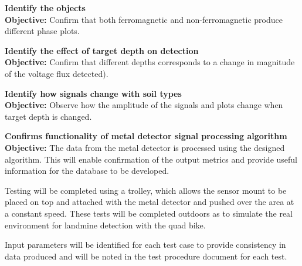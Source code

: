 \documentclass[main.tex]{subfiles}
\begin{document}
\begin{appendices}
\begin{mds}
\end{mds}

\begin{mds}
\textbf{Identify the objects}\\
\textbf{Objective:} Confirm that both ferromagnetic and non-ferromagnetic produce different phase plots.

\end{mds}

\begin{mds}
\textbf{Identify the effect of target depth on detection}\\
\textbf{Objective:} Confirm that different depths corresponds to a change in magnitude of the voltage flux detected). 

\end{mds}
\begin{mds}
\textbf{Identify how signals change with soil types}\\
\textbf{Objective:} Observe how the amplitude of the signals and plots change when target depth is changed. 

\end{mds}
\begin{mds}
\textbf{Confirms functionality of metal detector signal processing algorithm}\\
\textbf{Objective:} The data from the metal detector is processed using the designed algorithm. This will enable confirmation of the output metrics and provide useful information for the database to be developed. 

\end{mds}

\medskip\noindent
Testing will be completed using a trolley, which allows the sensor mount to be placed on top and attached with the metal detector and pushed over the area at a constant speed. These tests will be completed outdoors as to simulate the real environment for landmine detection with the quad bike. 

\medskip\noindent
Input parameters will be identified for each test case to provide consistency in data produced and will be noted in the test procedure document for each test. 


\end{appendices}
\end{document}
